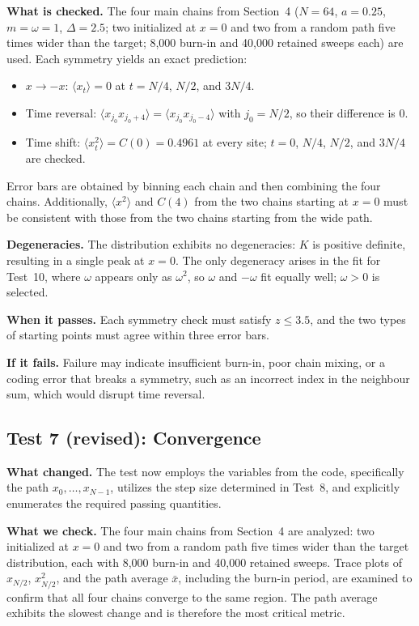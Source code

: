 \documentclass[11pt]{article}
\begin{document}
\textbf{What is checked.} The four main chains from Section~4 ($N = 64$, $a = 0.25$, $m = \omega = 1$, $\Delta = 2.5$; two initialized at $x = 0$ and two from a random path five times wider than the target; 8,000 burn-in and 40,000 retained sweeps each) are used. Each symmetry yields an exact prediction:
\begin{itemize}
\item $x \to -x$: $\langle x_t\rangle = 0$ at $t = N/4$, $N/2$, and $3N/4$.
\item Time reversal: $\langle x_{j_0}x_{j_0+4}\rangle = \langle x_{j_0}x_{j_0-4}\rangle$ with $j_0 = N/2$, so their difference is 0.
\item Time shift: $\langle x_t^2\rangle = C(0) = 0.4961$ at every site; $t = 0$, $N/4$, $N/2$, and $3N/4$ are checked.
\end{itemize}
Error bars are obtained by binning each chain and then combining the four chains. Additionally, $\langle x^2\rangle$ and $C(4)$ from the two chains starting at $x = 0$ must be consistent with those from the two chains starting from the wide path.

\textbf{Degeneracies.} The distribution exhibits no degeneracies: $K$ is positive definite, resulting in a single peak at $x = 0$. The only degeneracy arises in the fit for Test~10, where $\omega$ appears only as $\omega^2$, so $\omega$ and $-\omega$ fit equally well; $\omega > 0$ is selected.

\textbf{When it passes.} Each symmetry check must satisfy $z \le 3.5$, and the two types of starting points must agree within three error bars.

\textbf{If it fails.} Failure may indicate insufficient burn-in, poor chain mixing, or a coding error that breaks a symmetry, such as an incorrect index in the neighbour sum, which would disrupt time reversal.

\subsection*{Test 7 (revised): Convergence}
\textbf{What changed.} The test now employs the variables from the code, specifically the path $x_0, \dots, x_{N-1}$, utilizes the step size determined in Test~8, and explicitly enumerates the required passing quantities.

\textbf{What we check.} The four main chains from Section~4 are analyzed: two initialized at $x = 0$ and two from a random path five times wider than the target distribution, each with 8,000 burn-in and 40,000 retained sweeps. Trace plots of $x_{N/2}$, $x_{N/2}^2$, and the path average $\bar x$, including the burn-in period, are examined to confirm that all four chains converge to the same region. The path average exhibits the slowest change and is therefore the most critical metric.
\end{document}

